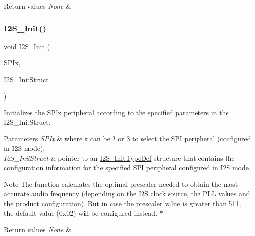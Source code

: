 \begin{DoxyRetVals}{Return values}
{\em None} & \\
\hline
\end{DoxyRetVals}
\mbox{\label{group___s_p_i___private___functions_ga53661884ae4a9640df7cbc59187782f7}} 
\subsubsection{\texorpdfstring{I2S\_Init()}{I2S\_Init()}}
{\footnotesize\ttfamily void I2\+S\+\_\+\+Init (\begin{DoxyParamCaption}\item[{\mbox{\hyperlink{struct_s_p_i___type_def}{S\+P\+I\+\_\+\+Type\+Def}} $\ast$}]{S\+P\+Ix,  }\item[{\mbox{\hyperlink{struct_i2_s___init_type_def}{I2\+S\+\_\+\+Init\+Type\+Def}} $\ast$}]{I2\+S\+\_\+\+Init\+Struct }\end{DoxyParamCaption})}



Initializes the S\+P\+Ix peripheral according to the specified parameters in the I2\+S\+\_\+\+Init\+Struct. 


\begin{DoxyParams}{Parameters}
{\em S\+P\+Ix} & where x can be 2 or 3 to select the S\+PI peripheral (configured in I2S mode). \\
\hline
{\em I2\+S\+\_\+\+Init\+Struct} & pointer to an \mbox{\hyperlink{struct_i2_s___init_type_def}{I2\+S\+\_\+\+Init\+Type\+Def}} structure that contains the configuration information for the specified S\+PI peripheral configured in I2S mode. \\
\hline
\end{DoxyParams}
\begin{DoxyNote}{Note}
The function calculates the optimal prescaler needed to obtain the most accurate audio frequency (depending on the I2S clock source, the P\+LL values and the product configuration). But in case the prescaler value is greater than 511, the default value (0x02) will be configured instead. $\ast$
\end{DoxyNote}

\begin{DoxyRetVals}{Return values}
{\em None} & \\
\hline
\end{DoxyRetVals}
\mbox{\label{group___s_p_i___private___functions_ga7470ec1d0759fdeeb42c7fe71a3b41b7}} 
